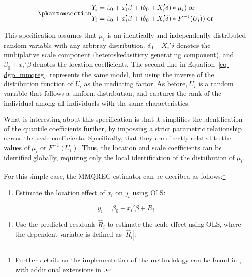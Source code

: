 \documentclass[bib]{statapress}
\providecommand{\tightlist}{%
  \setlength{\itemsep}{0pt}\setlength{\parskip}{0pt}}\usepackage{longtable,booktabs,array}
\begin{document}
\begin{equation}\phantomsection\label{eq-dgp_mmqreg}{\begin{aligned}
Y_{i} &= \beta_0 + x_{i}' \beta + (\delta_0 + X_{i}' \delta)*\mu_i) \text{ or} \\
Y_{i} &= \beta_0 + x_{i}' \beta + (\delta_0 + X_{i}' \delta)*F^{-1}(U_i)) \text{ or} 
\end{aligned}
}\end{equation}

This specification assumes that \(\mu_i\) is an identically and
independently distributed random variable with any arbitray
distribution. \(\delta_0 + X_{i}' \delta\) denotes the multiplative
scale component (heteroskedasiticty generating component), and
\(\beta_0 + x_{i}' \beta\) denotes the location coefficients. The second
line in Equation~\ref{eq-dgp_mmqreg}, represents the same model, but
using the inverse of the distribution function of \(U_i\) as the
mediating factor. As before, \(U_i\) is a random variable that follows a
uniform distribution, and captures the rank of the individual among all
individuals with the same characteristics.

What is interesting about this specification is that it simplifies the
identification of the quantile coefficients further, by impossing a
strict parametric relationship across the scale coefficients.
Specifically, that they are directly related to the values of \(\mu_i\)
or \(F^{-1}(U_i)\). Thus, the location and scale coefficients can be
identified globally, requiring only the local identification of the
distribution of \(\mu_i\).

For this simple case, the MMQREG estimator can be decribed as
follows:\footnote{Further details on the implementation of the
  methodology can be found in \citet{mss2019}, with additional
  extensions in \citet{riosavila2024}.}

\begin{enumerate}
\def\labelenumi{\arabic{enumi}.}
\tightlist
\item
  Estimate the location effect of \(x_{i}\) on \(y_{i}\) using OLS:
\end{enumerate}

\[y_{i} = \beta_0 + x_{i}' \beta + R_i\]

\begin{enumerate}
\def\labelenumi{\arabic{enumi}.}
\setcounter{enumi}{1}
\tightlist
\item
  Use the predicted residuals \(\hat R_i\) to estimate the scale effect
  using OLS, where the dependent variable is defined as \(|\hat R_i|\):
\end{enumerate}
\end{document}

